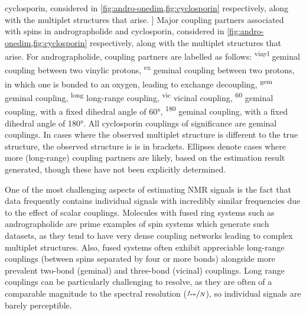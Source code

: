 \begin{table}
    cyclosporin, considered in \cref{fig:andro-onedim,fig:cyclosporin}
    respectively, along with the multiplet structures that arise.
]{
    Major coupling partners associated with spins in andrographolide and
    cyclosporin, considered in \cref{fig:andro-onedim,fig:cyclosporin}
    respectively, along with the multiplet structures that arise.
    For andrographolide, coupling partners are labelled as follows:
    \textsuperscript{vinyl} geminal coupling between two vinylic protons,
    \textsuperscript{ex} geminal coupling between two protons, in which one
    is bonded to an oxygen, leading to exchange decoupling\cite[Section
    2.6.1.5]{Claridge2016},
    \textsuperscript{gem} geminal coupling,
    \textsuperscript{long} long-range coupling,
    \textsuperscript{vic} vicinal coupling,
    \textsuperscript{60} geminal coupling, with a fixed dihedral angle of \ang{60},
    \textsuperscript{180} geminal coupling, with a fixed dihedral angle of \ang{180}.
    All cyclosporin couplings of significance are geminal couplings.
    In cases where the observed multiplet structure is different to the true
    structure, the observed structure is is in brackets. Ellipses denote cases
    where more (long-range) coupling partners are likely, based on the
    estimation result generated, though these have not been explicitly determined.
}
\label{tab:andro-multiplets}
\end{table}

One of the most challenging aspects of estimating \ac{NMR} signals is
the fact that data frequently contains individual signals with incredibly
similar frequencies due to the effect of scalar couplings. Molecules
with fused ring systems such as andrographolide are prime examples of spin
systems which generate such datasets, as they tend to have very dense coupling
networks leading to complex multiplet structures. Also, fused systems often
exhibit appreciable long-range couplings (between spins separated by four or
more bonds) alongside more prevalent two-bond (geminal) and three-bond
(vicinal) couplings. Long range couplings can be particularly challenging to
resolve, as they are often of a comparable magnitude to the spectral resolution
($\nicefrac{f_{\mathrm{sw}}}{N}$), so individual signals are barely perceptible.

